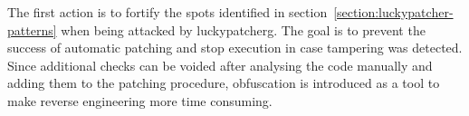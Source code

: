 The first action is to fortify the spots identified in section~\ref{section:luckypatcher-patterns} when being attacked by \gls{luckypatcherg}.
The goal is to prevent the success of automatic patching and stop execution in case tampering was detected.
Since additional checks can be voided after analysing the code manually and adding them to the patching procedure, obfuscation is introduced as a tool to make reverse engineering more time consuming.
